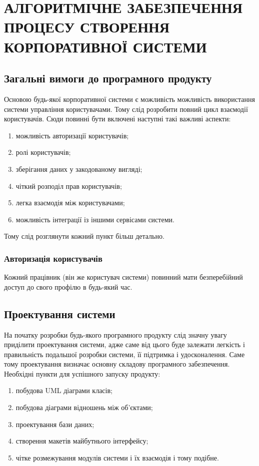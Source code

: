\section{АЛГОРИТМІЧНЕ ЗАБЕЗПЕЧЕННЯ ПРОЦЕСУ СТВОРЕННЯ КОРПОРАТИВНОЇ СИСТЕМИ}

\subsection{Загальні вимоги до програмного продукту}
Основою будь-якої корпоративної системи є можливість можливість використання системи управління користувачами.
Тому слід розробити повний цикл взаємодії користувачів. Сюди повинні бути включені наступні такі важливі аспекти:
\begin{enumerate}
	\item можливість авторизації користувачів;
	\item ролі користувачів;
	\item зберігання даних у закодованому вигляді;
	\item чіткий розподіл прав користувачів;
	\item легка взаємодія між користувачами;
	\item можливість інтеграції із іншими сервісами системи.
\end{enumerate}

\par Тому слід розглянути кожний пункт більш детально.

\subsubsection{Авторизація користувачів}
Кожний працівник (він же користувач системи) повинний мати безперебійний доступ до свого профілю в будь-який час.  


\subsection{Проектування системи}
На початку розробки будь-якого програмного продукту слід значну увагу приділити проектування системи, адже саме від цього буде залежати легкість і правильність подальшої розробки системи, її підтримка і удосконалення.
Саме тому проектування визначає основну складову програмного забезпечення. 
Необхідні пункти для успішного запуску  продукту:
\begin{enumerate}
	\item побудова UML діаграми класів;
	\item побудова діаграми відношень між об'єктами;
	\item проектування бази даних;
	\item створення макетів майбутнього інтерфейсу;
	\item чітке розмежування модулів системи і їх взаємодія і тому подібне.
\end{enumerate}

